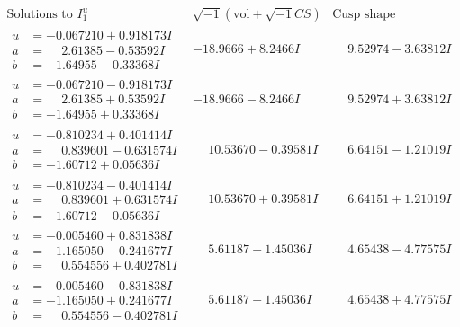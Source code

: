 \documentclass[1p]{elsarticle_modified}
\theoremstyle{definition}
\newcommand{\I}{\sqrt{-1}}
\begin{document}
$$\begin{array}{c|c|c}  
\text{Solutions to }I^u_{1}& \I (\text{vol} + \sqrt{-1}CS) & \text{Cusp shape}\\
 \hline 
\begin{aligned}
u &= -0.067210 + 0.918173 I \\
a &= \phantom{-}2.61385 - 0.53592 I \\
b &= -1.64955 - 0.33368 I\end{aligned}
 & -18.9666 + 8.2466 I & \phantom{-}9.52974 - 3.63812 I \\ \hline\begin{aligned}
u &= -0.067210 - 0.918173 I \\
a &= \phantom{-}2.61385 + 0.53592 I \\
b &= -1.64955 + 0.33368 I\end{aligned}
 & -18.9666 - 8.2466 I & \phantom{-}9.52974 + 3.63812 I \\ \hline\begin{aligned}
u &= -0.810234 + 0.401414 I \\
a &= \phantom{-}0.839601 - 0.631574 I \\
b &= -1.60712 + 0.05636 I\end{aligned}
 & \phantom{-}10.53670 - 0.39581 I & \phantom{-}6.64151 - 1.21019 I \\ \hline\begin{aligned}
u &= -0.810234 - 0.401414 I \\
a &= \phantom{-}0.839601 + 0.631574 I \\
b &= -1.60712 - 0.05636 I\end{aligned}
 & \phantom{-}10.53670 + 0.39581 I & \phantom{-}6.64151 + 1.21019 I \\ \hline\begin{aligned}
u &= -0.005460 + 0.831838 I \\
a &= -1.165050 - 0.241677 I \\
b &= \phantom{-}0.554556 + 0.402781 I\end{aligned}
 & \phantom{-}5.61187 + 1.45036 I & \phantom{-}4.65438 - 4.77575 I \\ \hline\begin{aligned}
u &= -0.005460 - 0.831838 I \\
a &= -1.165050 + 0.241677 I \\
b &= \phantom{-}0.554556 - 0.402781 I\end{aligned}
 & \phantom{-}5.61187 - 1.45036 I & \phantom{-}4.65438 + 4.77575 I \\ \hline\begin{aligned}

\end{aligned}
\end{array}$$
\end{document}

